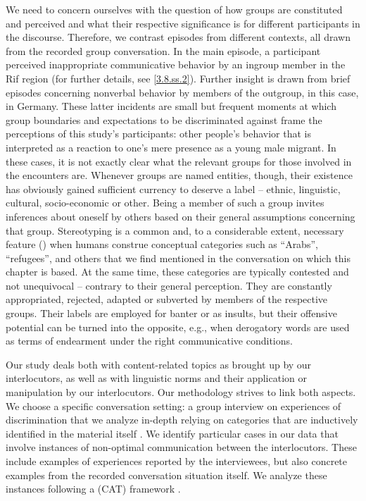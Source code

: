 \documentclass[output=paper,colorlinks,citecolor=brown]{langscibook}
\begin{document}
We need to concern ourselves with the question of how groups are constituted and perceived and what their respective significance is for different participants in the discourse. Therefore, we contrast episodes from different contexts, all drawn from the recorded group conversation. In the main episode, a participant perceived inappropriate communicative behavior by an ingroup member in the Rif region (for further details, see \ref{3.8.ss.2}). Further insight is drawn from brief episodes concerning nonverbal behavior by members of the outgroup, in this case, in Germany. These latter incidents are small but frequent moments at which group boundaries and expectations to be discriminated against frame the perceptions of this study's participants: other people's behavior that is interpreted as a reaction to one's mere presence as a young male migrant. In these cases, it is not exactly clear what the relevant groups for those involved in the encounters are. Whenever groups are named entities, though, their existence has obviously gained sufficient currency to deserve a label -- ethnic, linguistic, cultural, socio-economic or other. Being a member of such a group invites inferences about oneself by others based on their general assumptions concerning that group. Stereotyping is a common and, to a considerable extent, necessary feature (\citealt{lakoff1987}) when humans construe conceptual categories such as ``Arabs'', ``refugees'', and others that we find mentioned in the conversation on which this chapter is based. At the same time, these categories are typically contested and not unequivocal -- contrary to their general perception. They are constantly appropriated, rejected, adapted or subverted by members of the respective groups. Their labels are employed for banter or as insults, but their offensive potential can be turned into the opposite, e.g., when derogatory words are used as terms of endearment under the right communicative conditions. 

Our study deals both with content-related topics as brought up by our interlocutors, as well as with linguistic norms and their application or manipulation by our interlocutors. Our methodology strives to link both aspects. We choose a specific conversation setting: a group interview on experiences of discrimination that we analyze in-depth relying on categories that are inductively identified in the material itself \citep{kuckartz2016,mayring2016}. We identify particular cases in our data that involve instances of non-optimal communication between the interlocutors. These include examples of experiences reported by the interviewees, but also concrete examples from the recorded conversation situation itself. We analyze these instances following a  (CAT) framework \citep{giles2016}.
\end{document}
